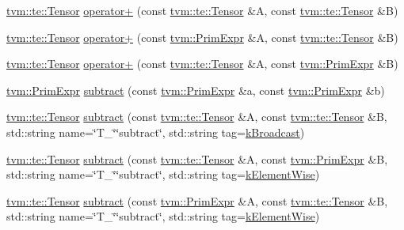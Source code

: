 \begin{DoxyCompactItemize}
\item 
\hyperlink{classtvm_1_1te_1_1Tensor}{tvm\+::te\+::\+Tensor} \hyperlink{namespacetopi_a9421cf0b3bfbbc0ca254232def067aa7}{operator+} (const \hyperlink{classtvm_1_1te_1_1Tensor}{tvm\+::te\+::\+Tensor} \&A, const \hyperlink{classtvm_1_1te_1_1Tensor}{tvm\+::te\+::\+Tensor} \&B)
\item 
\hyperlink{classtvm_1_1te_1_1Tensor}{tvm\+::te\+::\+Tensor} \hyperlink{namespacetopi_a44be2986ea7f7649b18085966f21208b}{operator+} (const \hyperlink{classtvm_1_1PrimExpr}{tvm\+::\+Prim\+Expr} \&A, const \hyperlink{classtvm_1_1te_1_1Tensor}{tvm\+::te\+::\+Tensor} \&B)
\item 
\hyperlink{classtvm_1_1te_1_1Tensor}{tvm\+::te\+::\+Tensor} \hyperlink{namespacetopi_ae695da6463ef2cc5f53595addc2eeb8b}{operator+} (const \hyperlink{classtvm_1_1te_1_1Tensor}{tvm\+::te\+::\+Tensor} \&A, const \hyperlink{classtvm_1_1PrimExpr}{tvm\+::\+Prim\+Expr} \&B)
\item 
\hyperlink{classtvm_1_1PrimExpr}{tvm\+::\+Prim\+Expr} \hyperlink{namespacetopi_aae35ca7f2b19e58bfa1fe5af449380d1}{subtract} (const \hyperlink{classtvm_1_1PrimExpr}{tvm\+::\+Prim\+Expr} \&a, const \hyperlink{classtvm_1_1PrimExpr}{tvm\+::\+Prim\+Expr} \&b)
\item 
\hyperlink{classtvm_1_1te_1_1Tensor}{tvm\+::te\+::\+Tensor} \hyperlink{namespacetopi_abf2447034575fb315933905fb83e214e}{subtract} (const \hyperlink{classtvm_1_1te_1_1Tensor}{tvm\+::te\+::\+Tensor} \&A, const \hyperlink{classtvm_1_1te_1_1Tensor}{tvm\+::te\+::\+Tensor} \&B, std\+::string name=\char`\"{}T\+\_\+\char`\"{}\char`\"{}subtract\char`\"{}, std\+::string tag=\hyperlink{namespacetopi_a794b9155e9ba9d1c9c42a1cff1fb645f}{k\+Broadcast})
\item 
\hyperlink{classtvm_1_1te_1_1Tensor}{tvm\+::te\+::\+Tensor} \hyperlink{namespacetopi_a1790501ccce2bc4fc3b2349ce2ac47a4}{subtract} (const \hyperlink{classtvm_1_1te_1_1Tensor}{tvm\+::te\+::\+Tensor} \&A, const \hyperlink{classtvm_1_1PrimExpr}{tvm\+::\+Prim\+Expr} \&B, std\+::string name=\char`\"{}T\+\_\+\char`\"{}\char`\"{}subtract\char`\"{}, std\+::string tag=\hyperlink{namespacetopi_ac1b34ed59d38a5f5338bee6b2cad42be}{k\+Element\+Wise})
\item 
\hyperlink{classtvm_1_1te_1_1Tensor}{tvm\+::te\+::\+Tensor} \hyperlink{namespacetopi_a130a3a82be00c6e92bfb3091d950115d}{subtract} (const \hyperlink{classtvm_1_1PrimExpr}{tvm\+::\+Prim\+Expr} \&A, const \hyperlink{classtvm_1_1te_1_1Tensor}{tvm\+::te\+::\+Tensor} \&B, std\+::string name=\char`\"{}T\+\_\+\char`\"{}\char`\"{}subtract\char`\"{}, std\+::string tag=\hyperlink{namespacetopi_ac1b34ed59d38a5f5338bee6b2cad42be}{k\+Element\+Wise})

\end{DoxyCompactItemize}
